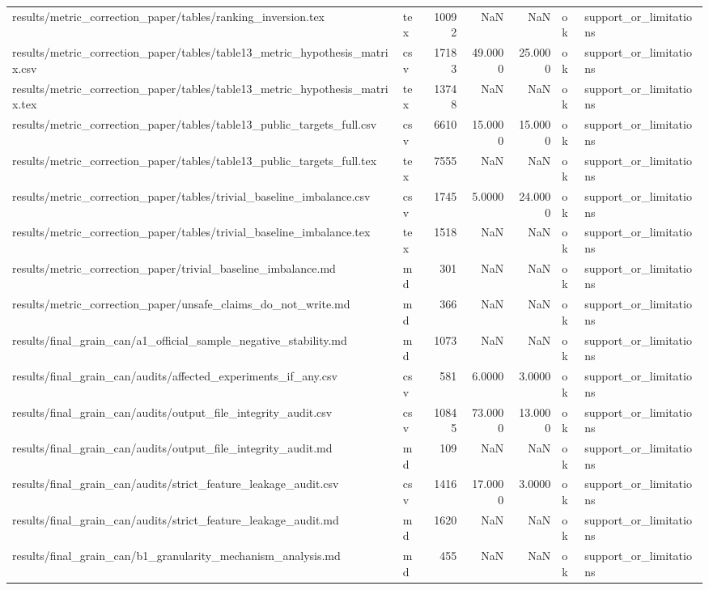 \begin{tabular}{llrrrll}
results/metric_correction_paper/tables/ranking_inversion.tex & tex & 10092 & NaN & NaN & ok & support_or_limitations \\
results/metric_correction_paper/tables/table13_metric_hypothesis_matrix.csv & csv & 17183 & 49.0000 & 25.0000 & ok & support_or_limitations \\
results/metric_correction_paper/tables/table13_metric_hypothesis_matrix.tex & tex & 13748 & NaN & NaN & ok & support_or_limitations \\
results/metric_correction_paper/tables/table13_public_targets_full.csv & csv & 6610 & 15.0000 & 15.0000 & ok & support_or_limitations \\
results/metric_correction_paper/tables/table13_public_targets_full.tex & tex & 7555 & NaN & NaN & ok & support_or_limitations \\
results/metric_correction_paper/tables/trivial_baseline_imbalance.csv & csv & 1745 & 5.0000 & 24.0000 & ok & support_or_limitations \\
results/metric_correction_paper/tables/trivial_baseline_imbalance.tex & tex & 1518 & NaN & NaN & ok & support_or_limitations \\
results/metric_correction_paper/trivial_baseline_imbalance.md & md & 301 & NaN & NaN & ok & support_or_limitations \\
results/metric_correction_paper/unsafe_claims_do_not_write.md & md & 366 & NaN & NaN & ok & support_or_limitations \\
results/final_grain_can/a1_official_sample_negative_stability.md & md & 1073 & NaN & NaN & ok & support_or_limitations \\
results/final_grain_can/audits/affected_experiments_if_any.csv & csv & 581 & 6.0000 & 3.0000 & ok & support_or_limitations \\
results/final_grain_can/audits/output_file_integrity_audit.csv & csv & 10845 & 73.0000 & 13.0000 & ok & support_or_limitations \\
results/final_grain_can/audits/output_file_integrity_audit.md & md & 109 & NaN & NaN & ok & support_or_limitations \\
results/final_grain_can/audits/strict_feature_leakage_audit.csv & csv & 1416 & 17.0000 & 3.0000 & ok & support_or_limitations \\
results/final_grain_can/audits/strict_feature_leakage_audit.md & md & 1620 & NaN & NaN & ok & support_or_limitations \\
results/final_grain_can/b1_granularity_mechanism_analysis.md & md & 455 & NaN & NaN & ok & support_or_limitations \\

\end{tabular}
